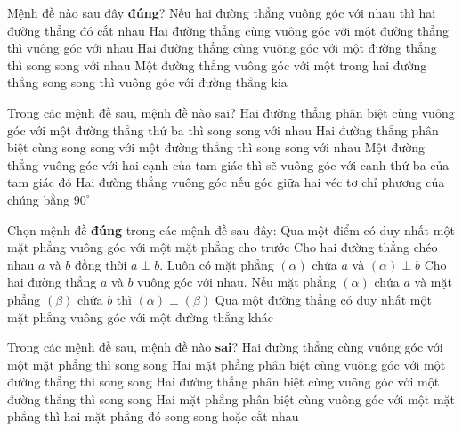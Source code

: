\begin{ex}%
	Mệnh đề nào sau đây {\bf  đúng}?
	\choice 
		{Nếu hai đường thẳng vuông góc với nhau thì hai đường thẳng đó cắt nhau} 
		{Hai đường thẳng cùng vuông góc với một đường  thẳng thì vuông góc với nhau}
		{Hai đường thẳng cùng vuông góc với một đường thẳng thì song song với nhau} 
		{\True Một đường  thẳng vuông góc với một trong hai đường thẳng song song thì vuông góc với đường thẳng kia}
\end{ex}

\begin{ex}%
	Trong  các mệnh đề sau, mệnh đề nào sai?
	 \choice
		{\True Hai đường thẳng phân biệt cùng vuông góc với một đường  thẳng thứ ba thì song song với nhau}
		{Hai đường thẳng phân biệt  cùng song song với một đường thẳng thì song song với nhau}
		{Một đường thẳng vuông góc với hai cạnh của tam giác thì sẽ vuông góc với cạnh  thứ ba của tam giác đó}
		{Hai đường thẳng vuông góc nếu góc giữa hai véc tơ chỉ  phương của chúng bằng $90^\circ$}
\end{ex}

\begin{ex}%
	Chọn mệnh đề \textbf{đúng} trong các mệnh đề sau đây: 
	\choice 
		{Qua một điểm có duy nhất một mặt phẳng vuông góc với một mặt phẳng cho trước} 
		{\True Cho hai đường thẳng chéo nhau $a$ và $b$  đồng thời $a\perp b$. Luôn có mặt phẳng $(\alpha)$ chứa $a$ và $(\alpha) \perp b$}
		{Cho hai đường thẳng $a$ và $b$ vuông góc với nhau. Nếu mặt phẳng $(\alpha)$ chứa $a$ và mặt phẳng $(\beta)$ chứa $b$ thì  $(\alpha)\perp(\beta)$}
		{Qua một đường thẳng có duy nhất một  mặt phẳng vuông góc với một đường thẳng khác}
\end{ex}

\begin{ex}%
	Trong các mệnh đề sau, mệnh đề nào  \textbf{sai}?
	 \choice
		{Hai đường thẳng cùng vuông góc với một mặt phẳng thì song  song}
		{Hai mặt phẳng phân biệt  cùng vuông góc với một đường thẳng thì song song}
		{\True Hai đường thẳng phân biệt cùng  vuông góc với một đường thẳng thì song song}
		{Hai mặt phẳng phân biệt cùng vuông góc với một mặt phẳng thì hai  mặt phẳng đó song song hoặc cắt nhau}
\end{ex}


